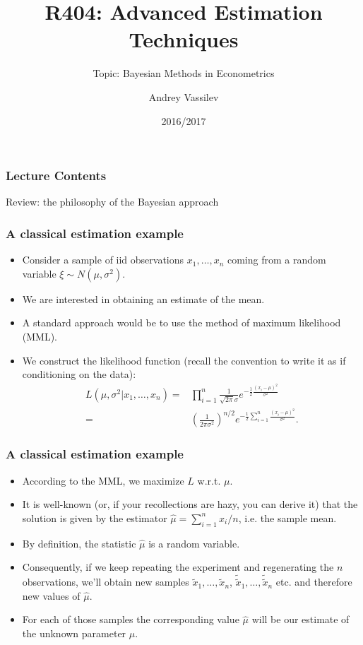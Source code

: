 \documentclass[10pt]{beamer}
\title{R404: Advanced Estimation Techniques}
\subtitle{Topic: Bayesian Methods in Econometrics}
\author{Andrey Vassilev}
\date{2016/2017}
\theoremstyle{definition}
\begin{document}
\maketitle



\begin{frame}[fragile]
\frametitle{Lecture Contents}
\tableofcontents
\end{frame}

\begin{section}{Review: the philosophy of the Bayesian approach}\label{sec:BayesPhil}

\begin{frame}
\frametitle{A classical estimation example}
\begin{itemize}\itemsep1em
\item Consider a sample of iid observations $x_1,\ldots,x_n$ coming from a random variable $\xi \sim N(\mu,\sigma^2)$.
\item We are interested in obtaining an estimate of the mean.
\item A standard approach would be to use the method of maximum likelihood (MML).
\item We construct the likelihood function (recall the convention to write it as if conditioning on the data):
\begin{equation}
\label{eq:NormLik}
\begin{split}
L(\mu,\sigma^2|x_1,\ldots,x_n)= & \prod_{i=1}^{n}\frac{1}{\sqrt{2\pi}\sigma}e^{-\frac{1}{2}\frac{(x_i-\mu)^2}{\sigma^2}}\\
= & \left(
\frac{1}{2\pi\sigma^2}
\right)^{n/2}e^{-\frac{1}{2}\sum_{i=1}^{n}\frac{(x_i-\mu)^2}{\sigma^2}}.
\end{split}
\end{equation}
\end{itemize}
\end{frame}

\begin{frame}
\frametitle{A classical estimation example}
\begin{itemize}\itemsep1em
\item According to the MML, we maximize $ L $ w.r.t. $ \mu $.
\item It is well-known (or, if your recollections are hazy, you can derive it) that the solution is given by the estimator $\hat{\mu}=\sum_{i=1}^{n}x_i/n$, i.e. the sample mean.
\item By definition, the statistic $\hat{\mu}$ is a random variable.
\item Consequently, if we keep repeating the experiment and regenerating the $ n $ observations, we'll obtain new samples $\tilde{x}_1,\ldots,\tilde{x}_n$,  $\tilde{\tilde{x}}_1,\ldots,\tilde{\tilde{x}}_n$ etc. and therefore new values of $\hat{\mu}$.
\item For each of those samples the corresponding value $\hat{\mu}$ will be our estimate of the unknown parameter $ \mu $.
\end{itemize}
\end{frame}


\end{section}
\end{document}
